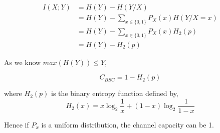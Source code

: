 \documentclass{article}
\begin{document}
\begin{align*}
    I(X;Y) &= H(Y) -H(Y/X) \\
    &= H(Y)- \sum_{x \in \{ 0, 1 \}} P_X(x) H(Y/X=x) \\
    &= H(Y)- \sum_{x \in \{ 0, 1 \}} P_X(x) H_2(p) \\
    &= H(Y) - H_2 (p)
\end{align*}

As we know $max(H(Y)) \leq Y$,

$$ C_{BSC} = 1- H_2(p)$$

where $H_2(p)$ is the binary entropy function defined by,
$$ H_2(x)= x \log_2 \frac{1}{x} + (1-x) \log_2 \frac{1}{1-x}$$

Hence if $P_x$ is a uniform distribution, the channel capacity can be 1.
\end{document}
